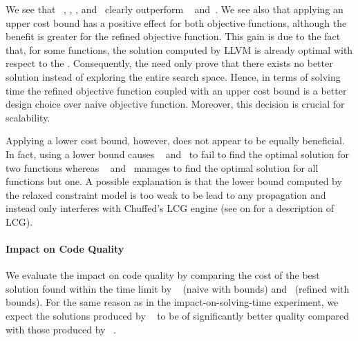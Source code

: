We see that ~,
, ,
and~ clearly outperform ~ and~.
%
We see also that applying an upper cost bound has a positive effect for both
\glspl{objective function}, although the benefit is greater for the refined
\gls{objective function}.
%
This gain is due to the fact that, for some \glspl{function}, the \gls{solution}
computed by \gls{LLVM} is already optimal with respect to the
.
%
Consequently, the  need only prove that there exists
no better \gls{solution} instead of exploring the entire \gls{search space}.
%
Hence, in terms of solving time the refined \gls{objective function} coupled
with an upper cost bound is a better design choice over naive \gls{objective
  function}.
%
Moreover, this decision is crucial for scalability.

Applying a lower cost bound, however, does not appear to be equally beneficial.
%
In fact, using a lower bound causes ~ and~ to
fail to find the optimal \gls{solution} for two \glspl{function} whereas
~
and~ manages to find the optimal \gls{solution} for
all \glspl{function} but one.
%
A possible explanation is that the lower bound computed by the relaxed
\gls{constraint model} is too weak to be lead to any \gls{propagation} and
instead only interferes with \gls{Chuffed}'s \gls{LCG} engine (see
 on
 for a description of \gls{LCG}).


\paragraph{Impact on Code Quality}

We evaluate the impact on code quality by comparing the cost of the best
\gls{solution} found within the time limit by ~ (naive  with
bounds) and~ (refined  with bounds).
%
For the same reason as in the impact-on-solving-time experiment, we expect the
\glspl{solution} produced by ~ to be of significantly better quality
compared with those produced by ~.

